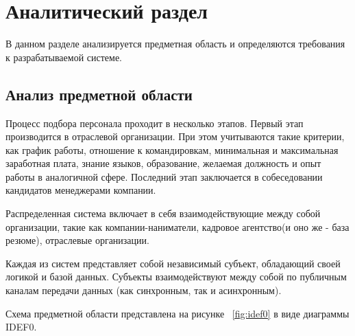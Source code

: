 \chapter{Аналитический раздел}
\label{cha:analysis}
В данном разделе анализируется предметная область и определяются требования к разрабатываемой системе.

\section{Анализ предметной области}
Процесс подбора персонала проходит в несколько этапов. Первый этап производится в отраслевой организации. При этом учитываются такие критерии, как график работы, отношение к командировкам, минимальная и максимальная заработная плата, знание языков, образование, желаемая должность и опыт работы в аналогичной сфере. Последний этап заключается в собеседовании кандидатов менеджерами компании.

Распределенная система включает в себя взаимодействующие между собой организации, такие как компании-наниматели, кадровое агентство(и оно же - база резюме), отраслевые организации.

Каждая из систем представляет собой независимый субъект, обладающий своей логикой и базой данных. Субъекты взаимодействуют между собой по публичным каналам передачи данных (как синхронным, так и асинхронным).

Схема предметной области представлена на рисунке ~\ref{fig:idef0} в виде диаграммы IDEF0.

